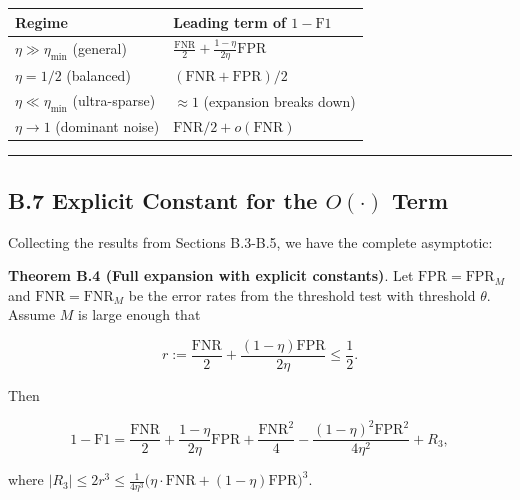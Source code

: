 \documentclass[
  12pt,
]{article}
\begin{document}
\begin{longtable}[]{@{}
  >{\raggedright\arraybackslash}p{}
  >{\raggedright\arraybackslash}p{}@{}}
\toprule\noalign{}
\begin{minipage}[b]{\linewidth}\raggedright
Regime
\end{minipage} & \begin{minipage}[b]{\linewidth}\raggedright
Leading term of \(1-\text{F1}\)
\end{minipage} \\
\midrule\noalign{}
\endhead
\bottomrule\noalign{}
\endlastfoot
\(\eta \gg \eta_{\min}\) (general) &
\(\frac{\text{FNR}}{2} + \frac{1-\eta}{2\eta}\text{FPR}\) \\
\(\eta = 1/2\) (balanced) & \((\text{FNR} + \text{FPR})/2\) \\
\(\eta \ll \eta_{\min}\) (ultra-sparse) & \(\approx 1\) (expansion
breaks down) \\
\(\eta \to 1\) (dominant noise) & \(\text{FNR}/2 + o(\text{FNR})\) \\
\end{longtable}

\begin{center}\rule{0.5\linewidth}{0.5pt}\end{center}

\subsection{\texorpdfstring{B.7 Explicit Constant for the \(O(\cdot)\)
Term}{B.7 Explicit Constant for the O(\textbackslash cdot) Term}}\label{b.7-explicit-constant-for-the-ocdot-term}

Collecting the results from Sections B.3-B.5, we have the complete
asymptotic:

\textbf{Theorem B.4 (Full expansion with explicit constants)}. Let
\(\text{FPR} = \text{FPR}_M\) and \(\text{FNR} = \text{FNR}_M\) be the
error rates from the threshold test with threshold \(\theta\). Assume
\(M\) is large enough that

\[r := \frac{\text{FNR}}{2} + \frac{(1-\eta)\text{FPR}}{2\eta} \leq \frac{1}{2}.\]

Then

\[
1 - \text{F1} = \frac{\text{FNR}}{2} + \frac{1-\eta}{2\eta}\text{FPR}
+ \frac{\text{FNR}^2}{4} - \frac{(1-\eta)^2\text{FPR}^2}{4\eta^2} + R_3,
\]

where
\(|R_3| \leq 2r^3 \leq \frac{1}{4\eta^3}\big(\eta\cdot\text{FNR} + (1-\eta)\text{FPR}\big)^3\).
\end{document}
